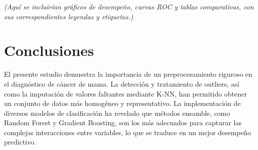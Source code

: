\textit{(Aquí se incluirían gráficos de desempeño, curvas ROC y tablas comparativas, con sus correspondientes leyendas y etiquetas.)}

\section{Conclusiones}
El presente estudio demuestra la importancia de un preprocesamiento riguroso en el diagnóstico de cáncer de mama. La detección y tratamiento de outliers, así como la imputación de valores faltantes mediante K-NN, han permitido obtener un conjunto de datos más homogéneo y representativo. La implementación de diversos modelos de clasificación ha revelado que métodos ensamble, como Random Forest y Gradient Boosting, son los más adecuados para capturar las complejas interacciones entre variables, lo que se traduce en un mejor desempeño predictivo.

